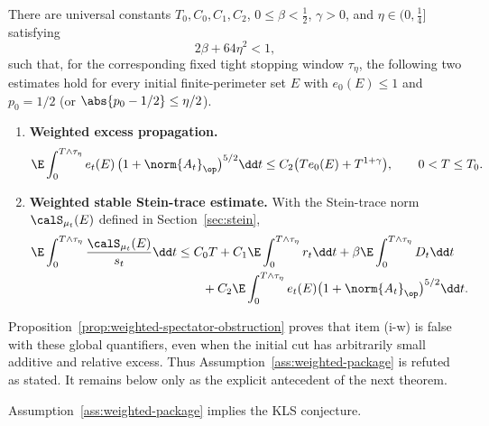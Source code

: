 \documentclass[../../main.tex]{subfiles}
\begin{document}
\begin{assumption}
\label{ass:weighted-package}
There are universal constants $T_0,C_0,C_1,C_2$, $0\le\beta<\tfrac12$, $\gamma>0$, and
$\eta\in(0,\tfrac14]$ satisfying
\begin{equation}\label{eq:weighted-absorption-margin}
  2\beta+64\eta^2<1,
\end{equation}
such that, for the corresponding fixed tight stopping window $\tau_\eta$, the following two
estimates hold for every initial finite-perimeter set $E$ with
$e_0(E)\le1$ and $p_0=1/2$ (or $\abs{p_0-1/2}\le\eta/2$).

\begin{enumerate}[label=(\roman*-w),leftmargin=3.2em]
  \item \textbf{Weighted excess propagation.}
  \begin{equation}\label{eq:intro-weighted-excess}
    \E\int_0^{T\wedge\tau_\eta} e_t(E)\,\bigl(1+\norm{A_t}_\op\bigr)^{5/2}\dd t
    \le C_2\bigl(T e_0(E)+T^{1+\gamma}\bigr),
    \qquad 0<T\le T_0 .
  \end{equation}

	  \item \textbf{Weighted stable Stein-trace estimate.}  With the Stein-trace norm
	  $\calS_{\mu_t}(E)$ defined in Section~\ref{sec:stein},
	  \begin{equation}\label{eq:intro-weighted-stein}
	  \begin{aligned}
	    \E\int_0^{T\wedge\tau_\eta}\frac{\calS_{\mu_t}(E)}{s_t}\dd t
	    &\le
	    C_0T+C_1\E\int_0^{T\wedge\tau_\eta}r_t\dd t
	    +\beta\E\int_0^{T\wedge\tau_\eta}D_t\dd t \\
	    &\qquad
	    +C_2\E\int_0^{T\wedge\tau_\eta}
	    e_t(E)\bigl(1+\norm{A_t}_\op\bigr)^{5/2}\dd t .
	  \end{aligned}
	  \end{equation}
\end{enumerate}
\end{assumption}

Proposition~\ref{prop:weighted-spectator-obstruction} proves that item (i-w) is false with these
global quantifiers, even when the initial cut has arbitrarily small additive and relative excess.
Thus Assumption~\ref{ass:weighted-package} is refuted as stated. It remains below only as the
explicit antecedent of the next theorem.

\begin{theorem}
\label{thm:intro-weighted}
Assumption~\ref{ass:weighted-package} implies the KLS conjecture.
\end{theorem}
\end{document}
